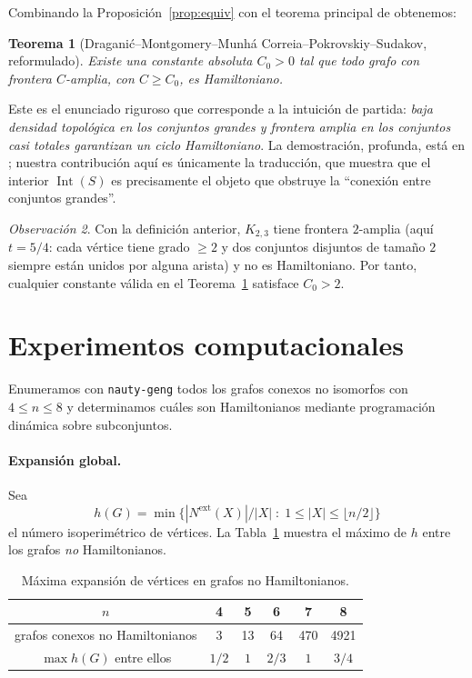 \documentclass[11pt,a4paper]{article}
\newtheorem{teorema}{Teorema}[section]
\theoremstyle{definition}
\theoremstyle{remark}
\newtheorem{observacion}[teorema]{Observación}
\newcommand{\Int}{\operatorname{Int}}
\newcommand{\Nx}{N^{\mathrm{ext}}}
\begin{document}
Combinando la Proposición~\ref{prop:equiv} con el teorema principal de \cite{dmmps} obtenemos:

\begin{teorema}[Draganić--Montgomery--Munhá Correia--Pokrovskiy--Sudakov, reformulado]\label{thm:dmmps}
Existe una constante absoluta $C_0>0$ tal que todo grafo con frontera $C$-amplia, con $C\ge C_0$, es Hamiltoniano.
\end{teorema}

Este es el enunciado riguroso que corresponde a la intuición de partida: \emph{baja densidad topológica en los conjuntos grandes y frontera amplia en los conjuntos casi totales garantizan un ciclo Hamiltoniano}. La demostración, profunda, está en \cite{dmmps}; nuestra contribución aquí es únicamente la traducción, que muestra que el interior $\Int(S)$ es precisamente el objeto que obstruye la ``conexión entre conjuntos grandes''.

\begin{observacion}\label{obs:k23}
Con la definición anterior, $K_{2,3}$ tiene frontera $2$-amplia (aquí $t=5/4$: cada vértice tiene grado $\ge2$ y dos conjuntos disjuntos de tamaño $2$ siempre están unidos por alguna arista) y no es Hamiltoniano. Por tanto, cualquier constante válida en el Teorema~\ref{thm:dmmps} satisface $C_0>2$.
\end{observacion}

\section{Experimentos computacionales}\label{sec:experimentos}

Enumeramos con \texttt{nauty-geng} todos los grafos conexos no isomorfos con $4\le n\le 8$ y determinamos cuáles son Hamiltonianos mediante programación dinámica sobre subconjuntos.

\paragraph{Expansión global.} Sea\[h(G)=\min\big\{|\Nx(X)|/|X| \;:\; 1\le|X|\le\lfloor n/2\rfloor\big\}\]el número isoperimétrico de vértices. La Tabla~\ref{tab:h} muestra el máximo de $h$ entre los grafos \emph{no} Hamiltonianos.

\begin{table}[h]
\centering
\begin{tabular}{cccccc}
\toprule
$n$ & 4 & 5 & 6 & 7 & 8\\
\midrule
grafos conexos no Hamiltonianos & 3 & 13 & 64 & 470 & 4921\\
$\max h(G)$ entre ellos & $1/2$ & $1$ & $2/3$ & $1$ & $3/4$\\
\bottomrule
\end{tabular}
\caption{Máxima expansión de vértices en grafos no Hamiltonianos.}\label{tab:h}
\end{table}
\end{document}
